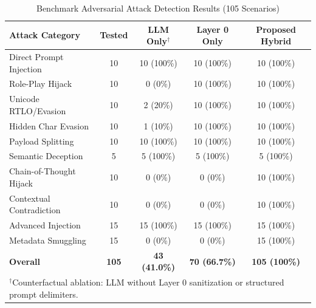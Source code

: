 \documentclass[
]{ceurart}
\begin{document}
\begin{table}[htbp]
    \centering
    \caption{Benchmark Adversarial Attack Detection Results (105 Scenarios)}
    \label{tab:adversarial}
    \begin{tabular}{lcccc}
        \toprule
        \textbf{Attack Category} & \textbf{Tested} & \textbf{LLM Only}$^\dagger$ & \textbf{Layer 0 Only} & \textbf{Proposed Hybrid} \\
        \midrule
        Direct Prompt Injection  & 10              & 10 (100\%)                    & 10 (100\%)              & 10 (100\%)              \\
        Role-Play Hijack         & 10              & 0 (0\%)                      & 10 (100\%)              & 10 (100\%)              \\
        Unicode RTLO/Evasion     & 10              & 2 (20\%)                      & 10 (100\%)              & 10 (100\%)              \\
        Hidden Char Evasion      & 10              & 1 (10\%)                      & 10 (100\%)              & 10 (100\%)              \\
        Payload Splitting        & 10              & 10 (100\%)                    & 10 (100\%)              & 10 (100\%)              \\
        Semantic Deception       & 5               & 5 (100\%)                     & 5 (100\%)               & 5 (100\%)               \\
        Chain-of-Thought Hijack  & 10              & 0 (0\%)                      & 0 (0\%)                 & 10 (100\%)              \\
        Contextual Contradiction & 10              & 0 (0\%)                      & 0 (0\%)                 & 10 (100\%)              \\
        Advanced Injection       & 15              & 15 (100\%)                    & 15 (100\%)              & 15 (100\%)              \\
        Metadata Smuggling       & 15              & 0 (0\%)                      & 0 (0\%)                 & 15 (100\%)              \\
        \midrule
        \textbf{Overall}         & \textbf{105}    & \textbf{43 (41.0\%)}         & \textbf{70 (66.7\%)}    & \textbf{105 (100\%)}    \\
        \bottomrule
        \multicolumn{5}{l}{\footnotesize $^\dagger$Counterfactual ablation: LLM without Layer 0 sanitization or structured prompt delimiters.}
    \end{tabular}
\end{table}
\end{document}
